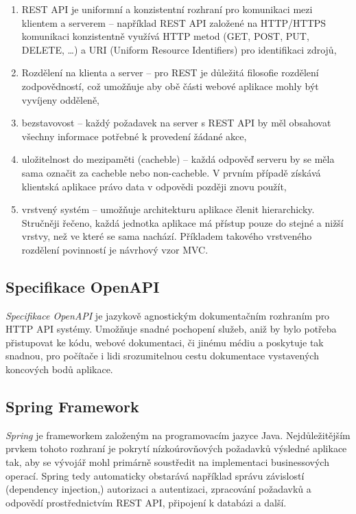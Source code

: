 \begin{enumerate}
\item REST API je uniformní a konzistentní rozhraní pro komunikaci mezi klientem a serverem – například REST API založené na HTTP/HTTPS komunikaci konzistentně využívá HTTP metod (GET, POST, PUT, DELETE, …) a URI (Uniform Resource Identifiers) pro identifikaci zdrojů,
\item Rozdělení na klienta a server – pro REST je důležitá filosofie rozdělení zodpovědností, což umožňuje aby obě části webové aplikace mohly být vyvíjeny odděleně,
\item bezstavovost – každý požadavek na server s REST API by měl obsahovat všechny informace potřebné k provedení žádané akce,
\item uložitelnost do mezipaměti (cacheble) – každá odpověď serveru by se měla sama označit za cacheble nebo non-cacheble. V prvním případě získává klientská aplikace právo data v odpovědi později znovu použít,
\item vrstvený systém – umožňuje architekturu aplikace členit hierarchicky. Stručněji řečeno, každá jednotka aplikace má přístup pouze do stejné a nižší vrstvy, než ve které se sama nachází. Příkladem takového vrstveného rozdělení povinností je návrhový vzor MVC.\cite{restfulapiWhatREST}
\end{enumerate}

\subsection{Specifikace OpenAPI}
\textit{Specifikace OpenAPI} je jazykově agnostickým dokumentačním rozhraním pro HTTP API systémy. Umožňuje snadné pochopení
služeb, aniž by bylo potřeba přistupovat ke kódu, webové dokumentaci, či jinému médiu a poskytuje tak snadnou, pro počítače i lidi srozumitelnou
cestu dokumentace vystavených koncových bodů aplikace.~\cite{OpenAPI}

\subsection{Spring Framework}
\label{subsection:spring}
\textit{Spring} je frameworkem založeným na programovacím jazyce Java. Nejdůležitějším prvkem tohoto rozhraní je pokrytí nízkoúrovňových požadavků výsledné aplikace tak, aby se vývojář mohl primárně soustředit na implementaci businessových operací. Spring tedy automaticky obstarává například správu závislostí (dependency injection,) autorizaci a autentizaci, zpracování požadavků a odpovědí prostřednictvím REST API, připojení k databázi a další.~\cite{spring}

